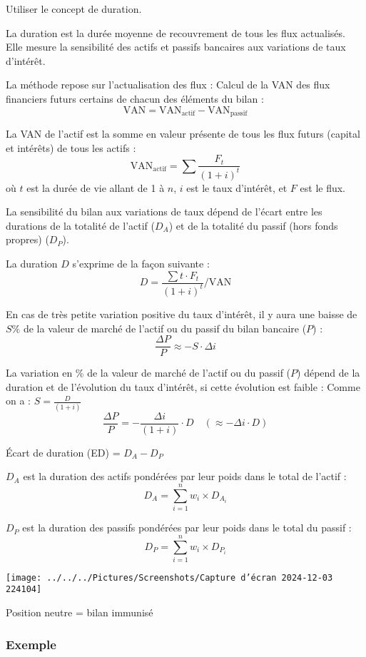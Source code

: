 \documentclass[a4paper, 12pt]{report}
\begin{document}
Utiliser le concept de duration.

La duration est la durée moyenne de recouvrement de tous les flux actualisés. Elle mesure la sensibilité des actifs et passifs bancaires aux variations de taux d’intérêt.

La méthode repose sur l’actualisation des flux :
Calcul de la VAN des flux financiers futurs certains de chacun des éléments du bilan :
\[
\text{VAN} = \text{VAN}_{\text{actif}} - \text{VAN}_{\text{passif}}
\]

La VAN de l’actif est la somme en valeur présente de tous les flux futurs (capital et intérêts) de tous les actifs :
\[
\text{VAN}_{\text{actif}} = \sum \frac{F_t}{(1+i)^t}
\]
où \(t\) est la durée de vie allant de 1 à \(n\), \(i\) est le taux d’intérêt, et \(F\) est le flux.

La sensibilité du bilan aux variations de taux dépend de l’écart entre les durations de la totalité de l’actif (\(D_A\)) et de la totalité du passif (hors fonds propres) (\(D_P\)).

La duration \(D\) s’exprime de la façon suivante :
\[
D = \frac{\sum t \cdot F_t}{(1+i)^t} \Big/ \text{VAN}
\]

En cas de très petite variation positive du taux d’intérêt, il y aura une baisse de \(S\%\) de la valeur de marché de l’actif ou du passif du bilan bancaire (\(P\)) :
\[
\frac{\Delta P}{P} \approx - S \cdot \Delta i
\]

La variation en  \% de la valeur de marché de l’actif ou du passif (\(P\)) dépend de la duration et de l’évolution du taux d’intérêt, si cette évolution est faible :
Comme on a : \(S = \frac{D}{(1+i)}\)
\[
\frac{\Delta P}{P} = - \frac{\Delta i}{(1+i)} \cdot D \quad (\approx -\Delta i \cdot D)
\]

Écart de duration (ED) = \(D_A - D_P\)

\(D_A\) est la duration des actifs pondérées par leur poids dans le total de l’actif :
\[
D_A = \sum_{i=1}^{n} w_i \times D_{A_i}
\]

\(D_P\) est la duration des passifs pondérées par leur poids dans le total du passif :
\[
D_P = \sum_{i=1}^{n} w_i \times D_{P_i}
\]

\begin{center}
	\texttt{[image: ../../../Pictures/Screenshots/Capture d'écran 2024-12-03 224104]}
\end{center}

 Position neutre = bilan immunisé

\subsubsection{Exemple}
\end{document}
